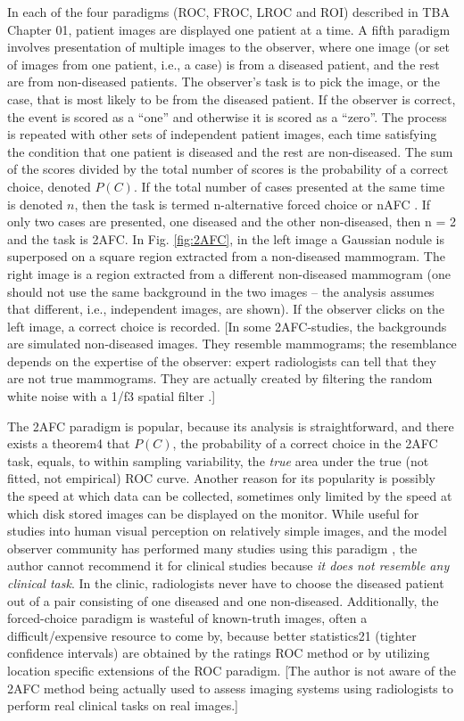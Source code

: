 \documentclass[
]{book}
\begin{document}
In each of the four paradigms (ROC, FROC, LROC and ROI) described in TBA Chapter 01, patient images are displayed one patient at a time. A fifth paradigm involves presentation of multiple images to the observer, where one image (or set of images from one patient, i.e., a case) is from a diseased patient, and the rest are from non-diseased patients. The observer's task is to pick the image, or the case, that is most likely to be from the diseased patient. If the observer is correct, the event is scored as a ``one'' and otherwise it is scored as a ``zero''. The process is repeated with other sets of independent patient images, each time satisfying the condition that one patient is diseased and the rest are non-diseased. The sum of the scores divided by the total number of scores is the probability of a correct choice, denoted \(P(C)\). If the total number of cases presented at the same time is denoted \(n\), then the task is termed n-alternative forced choice or nAFC \citep{RN298}. If only two cases are presented, one diseased and the other non-diseased, then n = 2 and the task is 2AFC. In Fig. \ref{fig:2AFC}, in the left image a Gaussian nodule is superposed on a square region extracted from a non-diseased mammogram. The right image is a region extracted from a different non-diseased mammogram (one should not use the same background in the two images -- the analysis assumes that different, i.e., independent images, are shown). If the observer clicks on the left image, a correct choice is recorded. {[}In some 2AFC-studies, the backgrounds are simulated non-diseased images. They resemble mammograms; the resemblance depends on the expertise of the observer: expert radiologists can tell that they are not true mammograms. They are actually created by filtering the random white noise with a 1/f3 spatial filter \citep{burgess2011visual}.{]}

The 2AFC paradigm is popular, because its analysis is straightforward, and there exists a theorem4 that \(P(C)\), the probability of a correct choice in the 2AFC task, equals, to within sampling variability, the \emph{true} area under the true (not fitted, not empirical) ROC curve. Another reason for its popularity is possibly the speed at which data can be collected, sometimes only limited by the speed at which disk stored images can be displayed on the monitor. While useful for studies into human visual perception on relatively simple images, and the model observer community has performed many studies using this paradigm \citep{RN1067}, the author cannot recommend it for clinical studies because \emph{it does not resemble any clinical task}. In the clinic, radiologists never have to choose the diseased patient out of a pair consisting of one diseased and one non-diseased. Additionally, the forced-choice paradigm is wasteful of known-truth images, often a difficult/expensive resource to come by, because better statistics21 (tighter confidence intervals) are obtained by the ratings ROC method or by utilizing location specific extensions of the ROC paradigm. {[}The author is not aware of the 2AFC method being actually used to assess imaging systems using radiologists to perform real clinical tasks on real images.{]}
\end{document}
